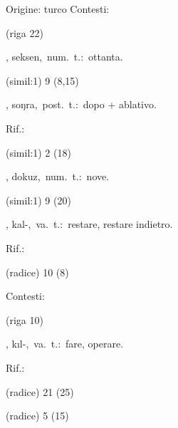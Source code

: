 \begin{glossario}{Origine: turco}
Contesti:
\begin{subvocedue}
\item[(riga 22)] 
\end{subvocedue}
\item[{\color{colorlowref}\spzrl{seks^En}},] {\sf seksen},\ num.\ t.:\ ottanta.
\begin{subvocedue}
\item[(simil:1)]   9 (8,15)
\end{subvocedue}
\item[{\color{colorlowref}\spzrl{.so^nr:H}},] {\sf soŋra},\ post.\ t.:\ dopo + ablativo.
\begin{subvocedue}
\item[Rif.:] 
\end{subvocedue}
\begin{subvocedue}
\item[(simil:1)]   2 (18)
\end{subvocedue}
\item[{\color{colorlowref}\spzrl{.toq.Uz}},] {\sf dokuz},\ num.\ t.:\ nove.
\begin{subvocedue}
\item[(simil:1)]   9 (20)
\end{subvocedue}
\item[{\color{colorlowref}\spzrl{q^AlB}},] {\sf kal-},\ va.\ t.:\ restare, restare indietro.
\begin{subvocedue}
\item[Rif.:] 
\end{subvocedue}
\begin{subvocedue}
\item[(radice)]   10 (8)
\end{subvocedue}


Contesti:
\begin{subvocedue}
\item[(riga 10)] 
\end{subvocedue}
\item[{\color{colorlowref}\spzrl{q:ilB}},] {\sf kıl-},\ va.\ t.:\ fare, operare.
\begin{subvocedue}
\item[Rif.:] 
\end{subvocedue}
\begin{subvocedue}
\item[(radice)]   21 (25)
\item[(radice)]   5 (15)
\end{subvocedue}



\end{glossario}
